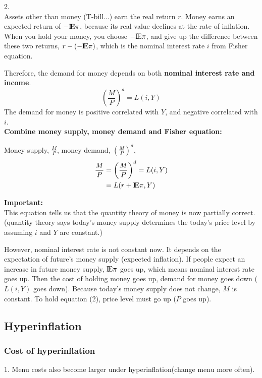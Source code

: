 \documentclass[12pt]{article}
\begin{document}
2.\\
Assets other than money (T-bill...) earn the real return $ r $.
Money earns an expected return of $  - {\rm I\!{E}}\pi $, because its real value 
declines at the rate of inflation.
When you hold your money, you choose $  - {\rm I\!{E}}\pi $, and give up the 
difference between these two returns, $ r - ( - {\rm I\!{E}}\pi) $, which is the
nominal interest rate $ i $ from Fisher equation.

Therefore, the demand for money depends on both {\textbf {nominal interest rate and
income}}.
\begin{equation*}
\left( \frac{M}{P} \right) ^{d} = L(i,Y)
\end{equation*}
The demand for money is positive correlated with $ Y $, and negative correlated with
$ i $.\\

{\textbf {Combine money supply, money demand and Fisher equation:}}

Money supply, $ \frac{M}{P} $, money demand, $ \left( \frac{M}{P} \right) ^{d} $,
\begin{align}
\frac{M}{P} &= \left( \frac{M}{P} \right)^{d} = L(i,Y)\\
 &= L(r + {\rm I\!{E}}\pi, Y)
\end{align}

{\textbf {Important:}}\\
This equation tells us that the quantity theory of money is now partially correct.
(quantity theory says today's money supply determines the today's price level by 
assuming $ i $ and $ Y $ are constant.)

However, nominal interest rate is not constant now. It depends on the expectation
of future's money supply (expected inflation). If people expect an increase in future
money supply, $ {\rm I\!{E}}\pi $ goes up, which means nominal interest rate goes up.
Then the cost of holding money goes up, demand for money goes down ($ L(i,Y) $ goes 
down). Because today's money supply does not change, $ M $ is constant. To hold
equation (2), price level must go up ($ P $ goes up).


\subsection{Hyperinflation}
\subsubsection{Cost of hyperinflation}
1. Menu costs also become larger under hyperinflation(change menu more often).
\end{document}
